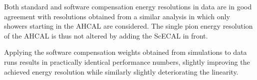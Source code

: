 \documentclass[twoside,a4paper,12pt]{article}
\begin{document}
Both standard and software compensation energy resolutions in data are in good agreement with resolutions obtained from a similar analysis in which only showers starting in the AHCAL are considered. The single pion energy resolution of the AHCAL is thus not altered by adding the ScECAL in front.

Applying the software compensation weights obtained from simulations to data runs results in practically identical performance numbers, slightly improving the achieved energy resolution while similarly slightly deteriorating the linearity. 
\clearpage


\end{document}
